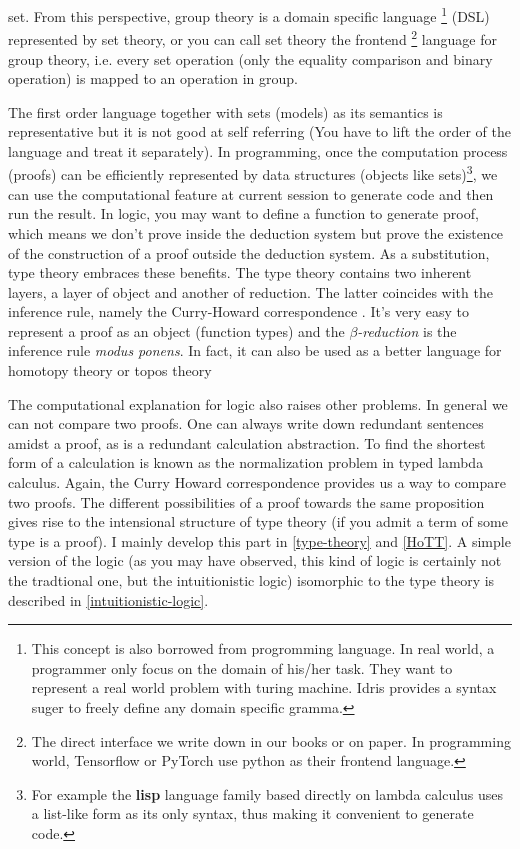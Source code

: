set. From this perspective, group theory is a domain specific language
\footnote{This concept is also borrowed from progromming language.
In real world, a programmer only focus on the domain of his/her task.
They want to represent a real world problem with turing machine. Idris
provides a syntax suger to freely define any domain specific gramma.} 
(DSL) represented by set theory, or you can call set theory the frontend 
\footnote{The direct interface we write down in our books or on paper. 
In programming world, Tensorflow or PyTorch use python as their frontend 
language.} language for group theory, i.e. every set operation (only the 
equality comparison and binary operation) is mapped to an operation in 
group. 

The first order language together 
with sets (models) as its semantics is representative but it is not good 
at self referring (You have to lift the order of the language and treat 
it separately). In programming, once the computation process (proofs) can 
be efficiently represented by data structures (objects like sets)\footnote{
    For example the {\bf lisp} language family based directly on lambda
    calculus uses a list-like form as its only syntax, thus making it
    convenient to generate code.
}, we can use the computational feature at current session to generate
code and then run the result. In logic, you may want to define a function
to generate proof, which means we don't prove inside the deduction system
but prove the existence of the construction of a proof outside the 
deduction system. As a substitution, type theory embraces these benefits. 
The type theory contains two inherent layers, a layer of object and
another of reduction. The latter coincides with the inference rule,
namely the Curry-Howard correspondence \cite{Curry-Howard,
intuitionistic-type-theory}. It's very easy to represent a proof as an
object (function types) and the {\it $\beta$-reduction} is the inference
rule {\it modus ponens}. In fact, it can also be used as a better language
for homotopy theory \cite{homotopy-type-theory} or topos theory
\cite{Introduction-to-higher-order-categorical-logic,categorical-logic-and-type-theory}

The computational explanation for logic also raises other problems.
In general we can not compare two proofs. One can always write down
redundant sentences amidst a proof, as is a redundant calculation
abstraction. To find the shortest form of a calculation is known as
the normalization problem in typed lambda calculus\cite{Curry-Howard}.
Again, the Curry Howard correspondence provides us a way to compare two
proofs. The different possibilities of a proof towards the same proposition
gives rise to the intensional structure of type theory (if you admit a
term of some type is a proof). I mainly develop this part in 
\autoref{type-theory} and \autoref{HoTT}. A simple version of the logic
(as you may have observed, this kind of logic is certainly not the
tradtional one, but the intuitionistic logic) isomorphic to the type
theory is described in \autoref{intuitionistic-logic}.

